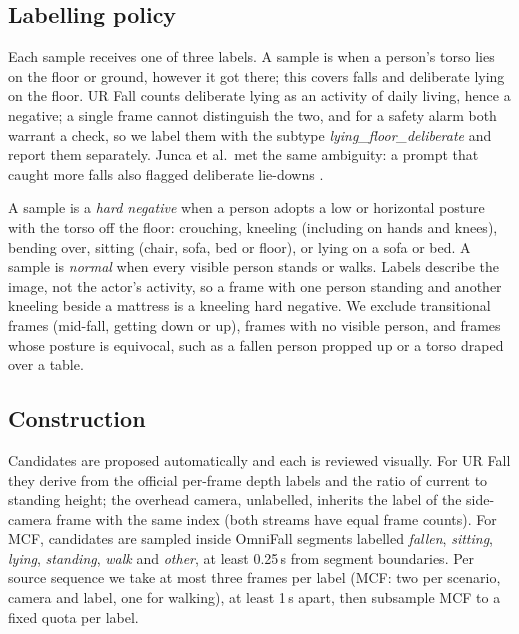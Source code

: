 \subsection{Labelling policy}
Each sample receives one of three labels. A sample is \pd{} when a person's torso lies on the floor or ground, however it got there; this covers falls and deliberate lying on the floor. UR Fall counts deliberate lying as an activity of daily living, hence a negative; a single frame cannot distinguish the two, and for a safety alarm both warrant a check, so we label them \pd{} with the subtype \textit{lying\_floor\_deliberate} and report them separately. Junca et al.\ met the same ambiguity: a prompt that caught more falls also flagged deliberate lie-downs \cite{junca2026thermal}.

A sample is a \textit{hard negative} when a person adopts a low or horizontal posture with the torso off the floor: crouching, kneeling (including on hands and knees), bending over, sitting (chair, sofa, bed or floor), or lying on a sofa or bed. A sample is \textit{normal} when every visible person stands or walks. Labels describe the image, not the actor's activity, so a frame with one person standing and another kneeling beside a mattress is a kneeling hard negative. We exclude transitional frames (mid-fall, getting down or up), frames with no visible person, and frames whose posture is equivocal, such as a fallen person propped up or a torso draped over a table.

\subsection{Construction}
Candidates are proposed automatically and each is reviewed visually. For UR Fall they derive from the official per-frame depth labels and the ratio of current to standing height; the overhead camera, unlabelled, inherits the label of the side-camera frame with the same index (both streams have equal frame counts). For MCF, candidates are sampled inside OmniFall segments labelled \textit{fallen}, \textit{sitting}, \textit{lying}, \textit{standing}, \textit{walk} and \textit{other}, at least 0.25\,s from segment boundaries. Per source sequence we take at most three frames per label (MCF: two per scenario, camera and label, one for walking), at least 1\,s apart, then subsample MCF to a fixed quota per label.

